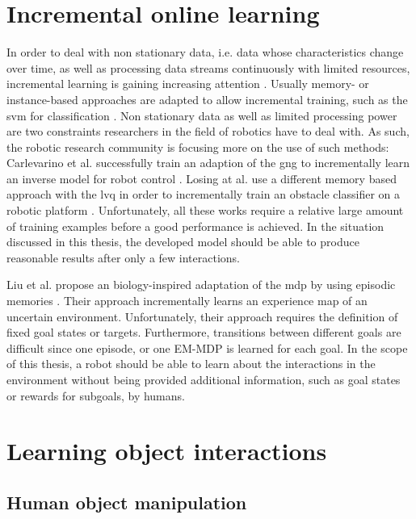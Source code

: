 \section{Incremental online learning}

In order to deal with non stationary data, i.e. data whose characteristics change over time, as well as processing data streams continuously with limited resources, incremental learning is gaining increasing attention \cite{polikar2014guest}. Usually memory- or instance-based approaches are adapted to allow incremental training, such as the \gls{svm} for classification \cite{diehl2003svm}. Non stationary data as well as limited processing power are two constraints researchers in the field of robotics have to deal with. As such, the robotic research community is focusing more on the use of such methods: 
Carlevarino et al. successfully train an adaption of the \gls{gng} to incrementally learn an inverse model for robot control \cite{carlevarino2000incremental}. 
Losing at al. use a different memory based approach with the \gls{lvq} in order to incrementally train an obstacle classifier on a robotic platform \cite{losing2015interactive}.
Unfortunately, all these works require a relative large amount of training examples before a good performance is achieved. In the situation discussed in this thesis, the developed model should be able to produce reasonable results after only a few interactions.

Liu et al. propose an biology-inspired adaptation of the \gls{mdp} by using episodic memories \cite{liu2015robotic, roboticEpisodes}. Their approach incrementally learns an experience map of an uncertain environment. 
Unfortunately, their approach requires the definition of fixed goal states or targets. Furthermore, transitions between different goals are difficult since one episode, or one EM-MDP is learned for each goal. 
In the scope of this thesis, a robot should be able to learn about the interactions in the environment without being provided additional information, such as goal states or rewards for subgoals, by humans.

\section{Learning object interactions}

\subsection{Human object manipulation}

